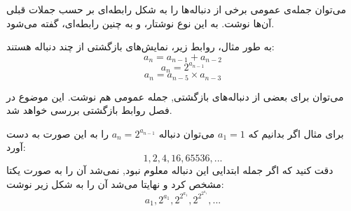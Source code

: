 
\begin{DEFINITION}
    \p
    می‌توان جمله‌ی عمومی برخی از دنباله‌ها را به شکل رابطه‌ای بر حسب جملات قبلی آن‌ها نوشت.
    به این نوع نوشتار،
    و به چنین رابطه‌ای،
    گفته می‌شود.
\end{DEFINITION}

\p
به طور مثال، روابط زیر، نمایش‌های بازگشتی از چند دنباله هستند:
$$a_n=a_{n-1}+a_{n-2}$$
$$a_n=2^{a_{n-1}}$$
$$a_n=a_{n-5}\times a_{n-3}$$

\p
می‌توان برای بعضی از دنباله‌های بازگشتی, جمله عمومی هم نوشت. این موضوع در فصل روابط بازگشتی بررسی خواهد شد.

\p
برای مثال اگر بدانیم که 
$a_1=1$
می‌توان دنباله
$a_n=2^{a_{n-1}}$
را به این صورت به دست آورد:
\[1,2,4,16,65536,...\]
دقت کنید که اگر جمله ابتدایی این دنباله معلوم نبود, نمی‌شد آن را به صورت یکتا مشخص کرد و نهایتا می‌شد آن را به شکل زیر نوشت:
\[a_1,2^{a_1},2^{2^{a_1}},2^{2^{2^{a_1}}},...\]








